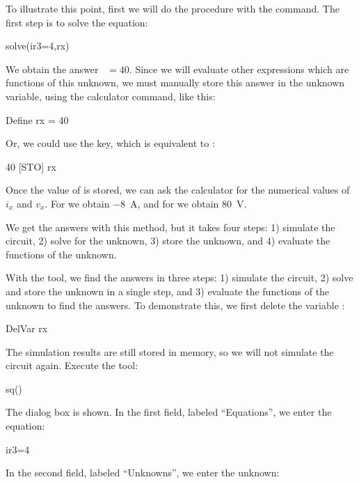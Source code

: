 To illustrate this point, first we will do the procedure with the
 command. The first step is to solve the equation:

\begin{entry}
solve(ir3=4,rx)
\end{entry}

We obtain the answer ~$= 40$. Since we will evaluate other
expressions which are functions of this unknown, we must manually
store this answer in the unknown variable, using the calculator
 command, like this:

\begin{entry}
Define rx = 40
\end{entry}

Or, we could use the  key, which is equivalent to
:

\begin{entry}
40 [STO] rx
\end{entry}

Once the value of  is stored, we can ask the calculator for
the numerical values of $i_x$ and $v_x$. For  we obtain
$-8$~A, and for  we obtain 80~V.

We get the answers with this method, but it takes four steps: 1)
simulate the circuit, 2) solve for the unknown, 3) store the
unknown, and 4) evaluate the functions of the unknown.

With the  tool, we find the answers in three steps: 1)
simulate the circuit, 2) solve and store the unknown in a single
step, and 3) evaluate the functions of the unknown to find the
answers. To demonstrate this, we first delete the variable
:

\begin{entry}
DelVar rx
\end{entry}

The simulation results are still stored in memory, so we will not
simulate the circuit again. Execute the  tool:

\begin{entry}
sq\solves()
\end{entry}

The dialog box is shown. In the first field, labeled ``Equations'',
we enter the equation:

\begin{entry}
ir3=4
\end{entry}

In the second field, labeled ``Unknowns'', we enter the unknown:


